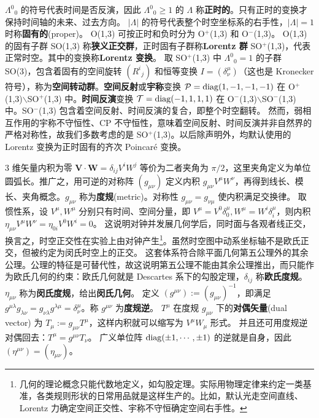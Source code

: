 $\Lambda^0{}_0$ 的符号代表时间是否反演，因此 $\Lambda^0{}_0\geqslant 1$ 的 $\Lambda$ 称\textbf{正时的}。只有正时的变换才保持时间轴的未来、过去方向。
$|\Lambda|$ 的符号代表整个时空坐标系的右手性，$|\Lambda|=1$ 时称\textbf{固有的}(proper)。
O(1,3) 可按正时和负时分为 O$^+$(1,3) 和 O$^-$(1,3)。
O(1,3) 的固有子群 SO(1,3) 称\textbf{狭义正交群}，正时固有子群称\textbf{Lorentz 群} SO$^+$(1,3)，代表正常时空。其中的变换称\textbf{Lorentz 变换}。
取 SO$^+$(1,3) 中 ${\Lambda^{0}}_{0}=1$ 的子群 SO(3)，包含着固有的空间旋转 $({R^{i}}_{j})$ 和恒等变换 $I=(\delta^\mu_\nu)$（这也是 Kronecker 符号），称为\textbf{空间转动群}。\textbf{空间反射}或\textbf{宇称}变换 $\mathcal P=\operatorname{diag}(1,-1,-1,-1)$ 在 O$^+$(1,3)$\backslash$SO$^+$(1,3) 中。\textbf{时间反演}变换 $\mathcal T=\operatorname{diag}(-1,1,1,1)$ 在 O$^-$(1,3)$\backslash$SO$^-$(1,3) 中。SO$^-$(1,3) 包含着空间反射、时间反演的复合，即整个时空翻转。
然而，弱相互作用的宇称不守恒性、CP 不守恒性，意味着空间反射、时间反演并非自然界的严格对称性，故我们多数考虑的是 SO$^+$(1,3)。以后除声明外，均默认使用的 Lorentz 变换为正时固有的齐次 Poincaré 变换。

3 维矢量内积为零 $\bm V\cdot\bm W=\delta_{ij}V^i W^j$ 等价为二者夹角为 $\pi/2$，这里夹角定义为单位圆弧长。推广之，用可逆的对称阵 $(g_{\mu\nu})$ 定义内积 $g_{\mu\nu}V^\mu W^\nu$，再得到线长、模长、夹角概念。$g_{\mu\nu}$ 称为\textbf{度规}(metric)。对称性 $g_{\mu\nu}=g_{\nu\mu}$ 使内积满足交换律。
取惯性系，设 $V^\mu,W^\mu$ 分别只有时间、空间分量，即 $V^\mu=V^0\delta_0^\mu,W^\mu=W^i\delta_i^\mu$，则内积 $\eta_{\mu\nu}V^\mu W^\nu=\eta_{0i}V^0W^i=0$。
这说明对钟并发展几何学后，同时面与各观者线正交，换言之，时空正交性在实验上由对钟产生\footnote{几何的理论概念只能代数地定义，如勾股定理。实际用物理定律来约定一类基准，各类规则形状的日常用品就是这样生产的。比如，默认光走空间直线、Lorentz 力确定空间正交性、宇称不守恒确定空间右手性。}。虽然时空图中动系坐标轴不是欧氏正交，但被约定为闵氏时空上的正交。
这套体系符合除平面几何第五公理外的其余公理。公理的特征是可替代性，故这说明第五公理不能由其余公理推出，而只能作为欧氏几何的约束：欧氏几何就是 Descartes 系下的勾股定理，$\delta_{ij}$ 称\textbf{欧氏度规}。
${\eta}_{\mu\nu}$ 称为\textbf{闵氏度规}，给出\textbf{闵氏几何}。
定义 $(g^{\mu\nu}):=(g_{\mu\nu})^{-1}$，即满足 $g^{\mu \lambda} g_{\lambda\nu}=g_{\nu\lambda}g^{\lambda\mu}=\delta^\mu_\nu$。称 $g^{\mu\nu}$ 为\textbf{度规逆}。
$T^\mu$ 在度规 $g_{\mu\nu}$ 下的\textbf{对偶矢量}(dual vector) 为 $T_\mu:=g_{\mu\nu} T^\mu$，这样内积就可以缩写为 $V^\mu W_\mu$ 形式。
并且还可用度规逆对偶回去：$T^\mu=g^{\mu\nu}T_\nu$。
广义单位阵 $\operatorname{diag}(\pm1,\cdots,\pm1)$ 的逆就是自身，因此 $(\eta^{\mu\nu})=(\eta_{\mu\nu})$。

